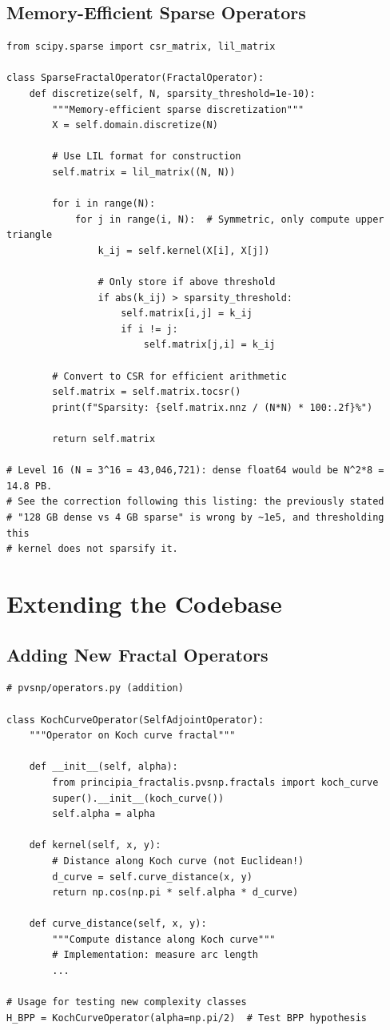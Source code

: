 \subsection{Memory-Efficient Sparse Operators}

\begin{verbatim}
from scipy.sparse import csr_matrix, lil_matrix

class SparseFractalOperator(FractalOperator):
    def discretize(self, N, sparsity_threshold=1e-10):
        """Memory-efficient sparse discretization"""
        X = self.domain.discretize(N)

        # Use LIL format for construction
        self.matrix = lil_matrix((N, N))

        for i in range(N):
            for j in range(i, N):  # Symmetric, only compute upper triangle
                k_ij = self.kernel(X[i], X[j])

                # Only store if above threshold
                if abs(k_ij) > sparsity_threshold:
                    self.matrix[i,j] = k_ij
                    if i != j:
                        self.matrix[j,i] = k_ij

        # Convert to CSR for efficient arithmetic
        self.matrix = self.matrix.tocsr()
        print(f"Sparsity: {self.matrix.nnz / (N*N) * 100:.2f}%")

        return self.matrix

# Level 16 (N = 3^16 = 43,046,721): dense float64 would be N^2*8 = 14.8 PB.
# See the correction following this listing: the previously stated
# "128 GB dense vs 4 GB sparse" is wrong by ~1e5, and thresholding this
# kernel does not sparsify it.
\end{verbatim}

\section{Extending the Codebase}
\label{sec:extending}

\subsection{Adding New Fractal Operators}

\begin{verbatim}
# pvsnp/operators.py (addition)

class KochCurveOperator(SelfAdjointOperator):
    """Operator on Koch curve fractal"""

    def __init__(self, alpha):
        from principia_fractalis.pvsnp.fractals import koch_curve
        super().__init__(koch_curve())
        self.alpha = alpha

    def kernel(self, x, y):
        # Distance along Koch curve (not Euclidean!)
        d_curve = self.curve_distance(x, y)
        return np.cos(np.pi * self.alpha * d_curve)

    def curve_distance(self, x, y):
        """Compute distance along Koch curve"""
        # Implementation: measure arc length
        ...

# Usage for testing new complexity classes
H_BPP = KochCurveOperator(alpha=np.pi/2)  # Test BPP hypothesis
\end{verbatim}

